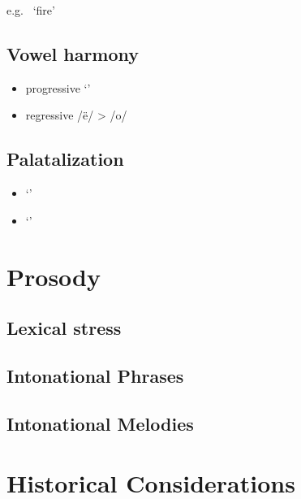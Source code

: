 \documentclass{memoir}
\begin{document}
e.g.~ `fire'

\subsection{\texorpdfstring{Vowel harmony
\label{sec:vowelharm}}{Vowel harmony }}

\begin{itemize}
\tightlist
\item
  progressive  `'
\item
  regressive /ë/ \textgreater{} /o/
\end{itemize}

\subsection{\texorpdfstring{Palatalization
\label{sec:palatalization}}{Palatalization }}

\begin{itemize}
\tightlist
\item
   `'
\item
   `'
\end{itemize}

\section{\texorpdfstring{Prosody \label{sec:prosody}}{Prosody }}

\subsection{\texorpdfstring{Lexical stress
\label{sec:stress}}{Lexical stress }}

\subsection{\texorpdfstring{Intonational Phrases
\label{sec:intphrases}}{Intonational Phrases }}


\subsection{\texorpdfstring{Intonational Melodies
\label{sec:intmelodies}}{Intonational Melodies }}

\section{\texorpdfstring{Historical Considerations
\label{sec:histphono}}{Historical Considerations }}
\end{document}
